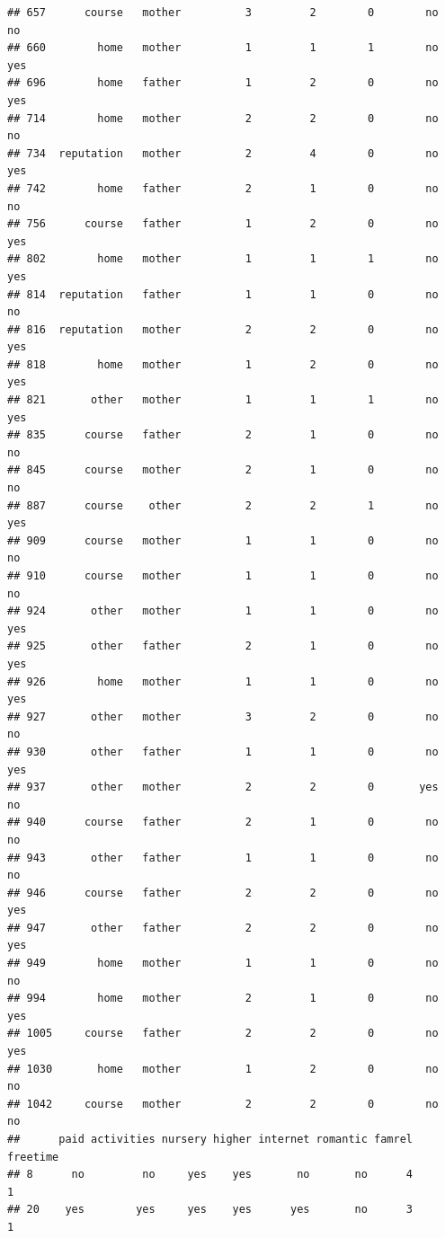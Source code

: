 \documentclass[]{article}
\begin{document}
\begin{verbatim}
## 657      course   mother          3         2        0        no     no
## 660        home   mother          1         1        1        no    yes
## 696        home   father          1         2        0        no    yes
## 714        home   mother          2         2        0        no     no
## 734  reputation   mother          2         4        0        no    yes
## 742        home   father          2         1        0        no     no
## 756      course   father          1         2        0        no    yes
## 802        home   mother          1         1        1        no    yes
## 814  reputation   father          1         1        0        no     no
## 816  reputation   mother          2         2        0        no    yes
## 818        home   mother          1         2        0        no    yes
## 821       other   mother          1         1        1        no    yes
## 835      course   father          2         1        0        no     no
## 845      course   mother          2         1        0        no     no
## 887      course    other          2         2        1        no    yes
## 909      course   mother          1         1        0        no     no
## 910      course   mother          1         1        0        no     no
## 924       other   mother          1         1        0        no    yes
## 925       other   father          2         1        0        no    yes
## 926        home   mother          1         1        0        no    yes
## 927       other   mother          3         2        0        no     no
## 930       other   father          1         1        0        no    yes
## 937       other   mother          2         2        0       yes     no
## 940      course   father          2         1        0        no     no
## 943       other   father          1         1        0        no     no
## 946      course   father          2         2        0        no    yes
## 947       other   father          2         2        0        no    yes
## 949        home   mother          1         1        0        no     no
## 994        home   mother          2         1        0        no    yes
## 1005     course   father          2         2        0        no    yes
## 1030       home   mother          1         2        0        no     no
## 1042     course   mother          2         2        0        no     no
##      paid activities nursery higher internet romantic famrel freetime
## 8      no         no     yes    yes       no       no      4        1
## 20    yes        yes     yes    yes      yes       no      3        1

\end{verbatim}
\end{document}
